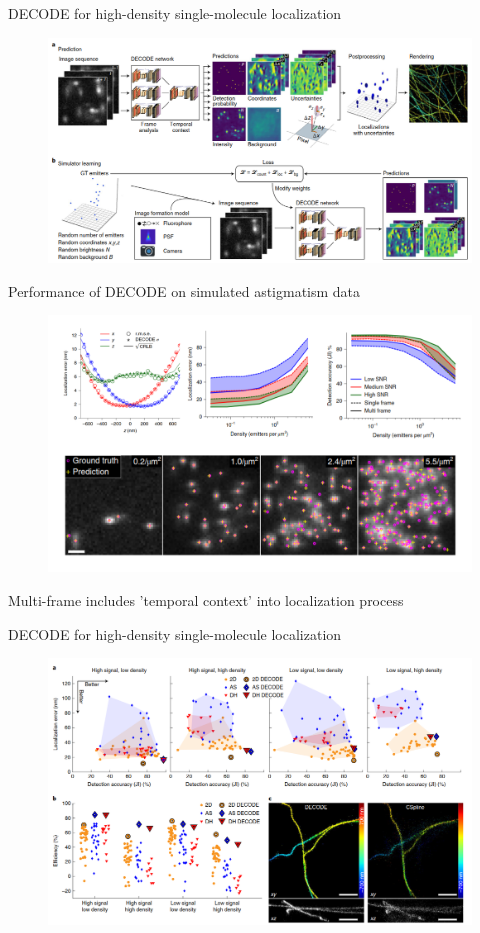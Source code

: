 \documentclass{beamer}			%
\begin{document}
\begin{frame}{DECODE for high-density single-molecule localization}
\begin{figure}
\includegraphics[width=13cm]{decode/Figure-1.png}
\end{figure}
\end{frame}

\begin{frame}{Performance of DECODE on simulated astigmatism data}
\begin{figure}
\includegraphics[width=12cm]{decode/Figure-2.png}
\end{figure}
Multi-frame includes 'temporal context' into localization process
\end{frame}


\begin{frame}{DECODE for high-density single-molecule localization}
\begin{figure}
\includegraphics[width=13cm]{decode/Figure-3.png}
\end{figure}
\end{frame}
\end{document}
